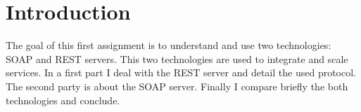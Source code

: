 \section*{Introduction}

The goal of this first assignment is to understand and use two technologies: SOAP and REST
 servers. This two technologies are used to integrate and scale services.
 In a first part I deal with the REST server and detail the used protocol. The second party is about the SOAP server. Finally I compare briefly the both technologies and conclude.